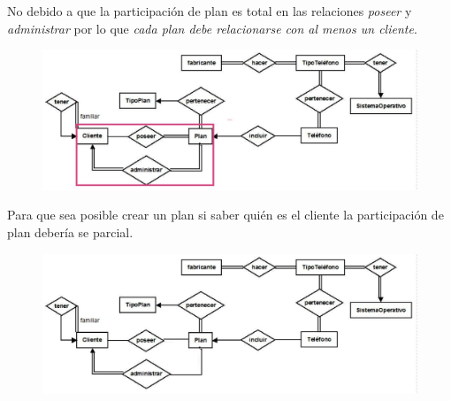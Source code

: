 \documentclass[letterpaper,11pt]{article}
\begin{document}
\begin{itemize}
    No debido a que la participación de plan es total en las relaciones \textit{poseer} 
    y \textit{administrar} por lo que \textit{cada plan debe relacionarse con al menos 
    un cliente}. 
    \begin{figure}[H]
        \centering
        \includegraphics[scale=0.4]{./imagenes/modelo3a.jpg}
    \end{figure}
    Para que sea posible crear un plan si saber quién es el cliente la participación
    de plan debería se parcial.
    \begin{figure}[H]
        \centering
        \includegraphics[scale=0.4]{./imagenes/modelo3b.jpg}
    \end{figure}


\end{itemize}
\end{document}
